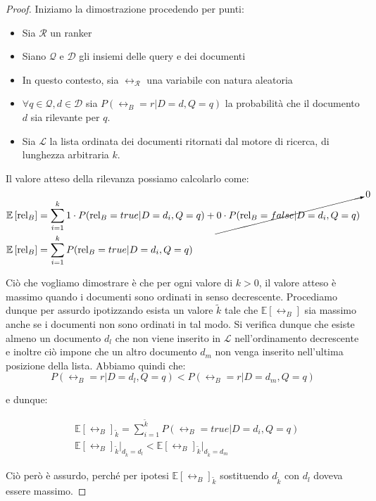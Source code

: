 \begin{proof}
	Iniziamo la dimostrazione procedendo per punti:
	\begin{itemize}
		\item Sia $\mathcal{R}$ un ranker
		\item Siano $\mathcal{Q}$ e $\mathcal{D}$ gli insiemi delle query e dei documenti
		\item In questo contesto, sia $\rel_\mathcal{R}$ una variabile con natura aleatoria
		\item $\forall{q \in \mathcal{Q}, d \in \mathcal{D}}$ sia $P(\rel_B = r  | D = d, Q = q )$
		la probabilità che il documento $d$ sia rilevante per $q$.
		\item Sia $\mathcal{L}$  la lista ordinata dei documenti ritornati dal motore di ricerca, di lunghezza arbitraria
		$k$.
	\end{itemize}
	
	Il valore atteso della rilevanza possiamo calcolarlo come:
	\begin{align*}
	& \mathbb{E}\left[\text{rel}_B\right] = \sum_{i=1}^{k}{
		1 \cdot P(\text{rel}_B = true  | D = d_i, Q = q ) + \cancelto{0}{0 \cdot  P(\text{rel}_B = false  | D = d_i, Q = q )}
	} \\
	& \mathbb{E}\left[\text{rel}_B\right] = \sum_{i=1}^{k}{P(\text{rel}_B = true  | D = d_i, Q = q )}
	\end{align*}
	
	Ciò che vogliamo dimostrare è che per ogni valore di $k>0$, il valore atteso è massimo quando i documenti
	sono ordinati in senso decrescente.
	Procediamo dunque per assurdo ipotizzando esista un valore $\tilde{k}$ tale che $\mathbb{E}[\rel_B]$ sia
	massimo anche se i documenti non sono ordinati in tal modo.
	Si verifica dunque che esiste almeno un documento $d_l$ che non viene inserito in $\mathcal{L}$ nell'ordinamento
	decrescente e inoltre ciò impone che un altro documento $d_m$ non venga inserito nell'ultima posizione della lista.
	Abbiamo quindi che:
	$$
	P(\rel_B = r | D = d_l, Q=q)  < P(\rel_B = r| D = d_m, Q = q)
	$$
	
	e dunque:
	
	\begin{align*}
	& \mathbb{E}\left[\rel_B\right]_{\tilde{k}} = \sum_{i=1}^{\tilde{k}}{P(\rel_B = true | D = d_i, Q = q)} \\
	& \mathbb{E}[\rel_B]_{\tilde{k}} \Big|_{d_{\tilde{k}} = d_{l}} < \mathbb{E}[\rel_B]_{\tilde{k}} \Big|_{d_{\tilde{k}} = d_{m}}
	\end{align*}
	
	Ciò però è assurdo, perché per ipotesi $\mathbb{E}\left[\rel_B\right]_{\tilde{k}}$ sostituendo $d_{\tilde{k}}$ con $d_l$ doveva
	essere massimo.
\end{proof}

